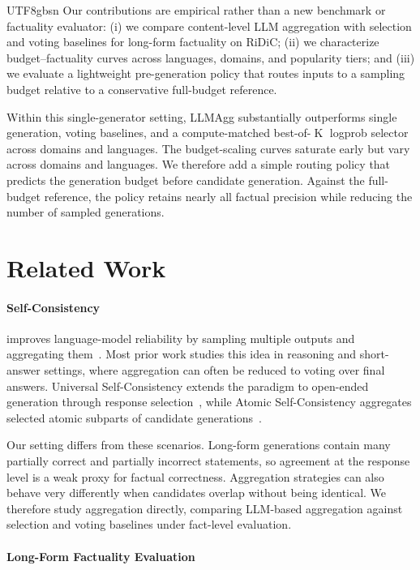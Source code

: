 \documentclass[11pt]{article}
\begin{document}
\begin{CJK*}{UTF8}{gbsn}
Our contributions are empirical rather than a new benchmark or factuality evaluator: (i) we compare content-level LLM aggregation with selection and voting baselines for long-form factuality on RiDiC; (ii) we characterize budget--factuality curves across languages, domains, and popularity tiers; and (iii) we evaluate a lightweight pre-generation policy that routes inputs to a sampling budget relative to a conservative full-budget reference.

Within this single-generator setting, LLMAgg substantially outperforms single generation, voting baselines, and a compute-matched best-of-$\operatorname{K}$ logprob selector across domains and languages. The budget-scaling curves saturate early but vary across domains and languages. We therefore add a simple routing policy that predicts the generation budget before candidate generation. Against the full-budget reference, the policy retains nearly all factual precision while reducing the number of sampled generations.

\section{Related Work}

\paragraph{Self-Consistency} improves language-model reliability by sampling multiple outputs and aggregating them~\citep{self-consistency}. Most prior work studies this idea in reasoning and short-answer settings, where aggregation can often be reduced to voting over final answers. Universal Self-Consistency extends the paradigm to open-ended generation through response selection~\citep{universal-self-consistency}, while Atomic Self-Consistency aggregates selected atomic subparts of candidate generations~\citep{thirukovalluru-etal-2024-atomic}.

Our setting differs from these scenarios. Long-form generations contain many partially correct and partially incorrect statements, so agreement at the response level is a weak proxy for factual correctness. Aggregation strategies can also behave very differently when candidates overlap without being identical. We therefore study aggregation directly, comparing LLM-based aggregation against selection and voting baselines under fact-level evaluation.

\paragraph{Long-Form Factuality Evaluation}


\end{CJK*}
\end{document}
